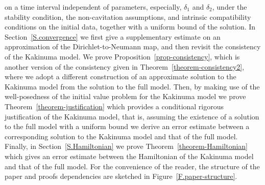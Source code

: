 \documentclass[11pt,leqno]{article}
\numberwithin{equation}{section}
\numberwithin{figure}{section}
\begin{document}
on a time interval independent of parameters, especially, $\delta_1$ and $\delta_2$, under the stability condition, 
the non-cavitation assumptions, and intrinsic compatibility conditions on the initial data, together with a uniform bound of the solution. 
In Section~\ref{S.convergence} we first give a supplementary estimate on an approximation of the Dirichlet-to-Neumann map, 
and then revisit the consistency of the Kakinuma model. 
We prove Proposition~\ref{prop-consistency}, which is another version of the consistency given in 
Theorem~\ref{theorem-consistency2}, where we adopt a different construction of an approximate solution to the Kakinuma model 
from the solution to the full model. 
Then, by making use of the well-posedness of the initial value problem for the Kakinuma model we prove 
Theorem~\ref{theorem-justification} which provides a conditional rigorous justification of the Kakinuma model, that is, 
assuming the existence of a solution to the full model with a uniform bound we derive an error estimate between 
a corresponding solution to the Kakinuma model and that of the full model.
Finally, in Section~\ref{S.Hamiltonian} we prove Theorem~\ref{theorem-Hamiltonian} which gives an error estimate between the Hamiltonian of the Kakinuma model and that of the full model. For the convenience of the reader, the structure of the paper and proofs dependencies are sketched in Figure~\ref{F.paper-structure}. 
\end{document}
